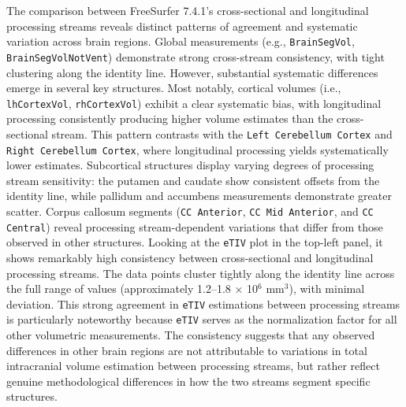 \documentclass[diagnostics,article,accept,pdftex,moreauthors]{Definitions/mdpi}
\begin{document}
The comparison between FreeSurfer 7.4.1's cross-sectional and longitudinal processing streams reveals distinct patterns of agreement and systematic variation across brain regions. Global measurements (e.g., \texttt{BrainSegVol}, \texttt{BrainSegVolNotVent}) demonstrate strong cross-stream consistency, with tight clustering along the identity line. However, substantial systematic differences emerge in several key structures. Most notably, cortical volumes (i.e., \texttt{lhCortexVol}, \texttt{rhCortexVol}) exhibit a clear systematic bias, with longitudinal processing consistently producing higher volume estimates than the cross-sectional stream. This pattern contrasts with the \texttt{Left Cerebellum Cortex} and \texttt{Right Cerebellum Cortex}, where longitudinal processing yields systematically lower estimates. Subcortical structures display varying degrees of processing stream sensitivity: the putamen and caudate show consistent offsets from the identity line, while pallidum and accumbens measurements demonstrate greater scatter. Corpus callosum segments (\texttt{CC Anterior}, \texttt{CC Mid Anterior}, and \texttt{CC Central}) reveal processing stream-dependent variations that differ from those observed in other structures. Looking at the \texttt{eTIV} plot in the top-left panel, it shows remarkably high consistency between cross-sectional and longitudinal processing streams. The data points cluster tightly along the identity line across the full range of values (approximately 1.2--1.8 × 10$^6$ mm$^3$), with minimal deviation. This strong agreement in \texttt{eTIV} estimations between processing streams is particularly noteworthy because \texttt{eTIV} serves as the normalization factor for all other volumetric measurements. The consistency suggests that any observed differences in other brain regions are not attributable to variations in total intracranial volume estimation between processing streams, but rather reflect genuine methodological differences in how the two streams segment specific structures.

\vspace{-10pt}
\end{document}
